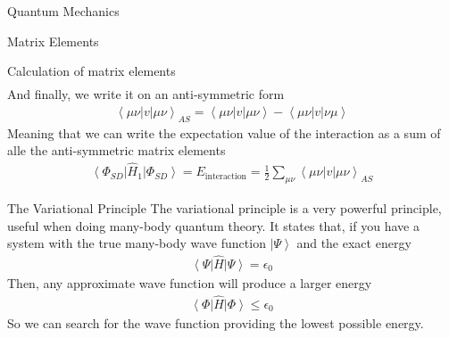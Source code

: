 \documentclass[twoside,english]{uiofysmaster}
\begin{document}
\begin{chapter}{Quantum Mechanics}
\begin{section}{Matrix Elements}
\begin{subsection}{Calculation of matrix elements}
\begin{align}
			\end{align}
			And finally, we write it on an anti-symmetric form
			\begin{align}
				\left< \mu \nu | v | \mu \nu \right>_{AS} = \left< \mu \nu | v | \mu \nu \right> - \left< \mu \nu | v | \nu \mu \right> 
			\end{align}
			Meaning that we can write the expectation value of the interaction as a sum of alle the anti-symmetric matrix elements
			\begin{align}
				\left< \Phi_{SD} \right| \hat H_1 \left| \Phi_{SD} \right> = E_{\text{interaction}} = \frac{1}{2} \sum_{\mu \nu} \left< \mu \nu | v | \mu \nu \right>_{AS}
 			\end{align}
		\end{subsection}
	\end{section}

	\newpage

	\begin{section}{The Variational Principle}
		The variational principle is a very powerful principle, useful when doing many-body quantum theory. It states that, if you have a system with the true many-body wave function $\left| \Psi \right>$ and the exact energy
		\begin{align}
			\left< \Psi \right| \hat H \left| \Psi \right> = \epsilon_0
		\end{align}
		Then, any approximate wave function will produce a larger energy \cite{Szabo}
		\begin{align}
			\left< \Phi \right| \hat H \left| \Phi \right> \leq \epsilon_0
		\end{align}
		So we can search for the wave function providing the lowest possible energy.
	\end{section}

\end{chapter}
\end{document}
